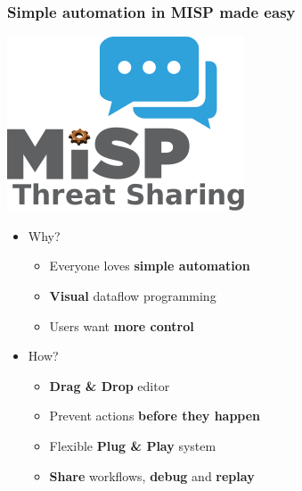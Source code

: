 \begin{frame}
    \frametitle{Simple automation in MISP made easy}
    \begin{center}
        \includegraphics[width=0.3\linewidth]{pictures/automation.png}
    \end{center}
    \begin{itemize}
        \item Why?
        \begin{itemize}
            \item Everyone loves \textbf{simple automation}
            \item \textbf{Visual} dataflow programming
            \item Users want \textbf{more control}
        \end{itemize}
        \item How?
        \begin{itemize}
            \item \textbf{Drag \& Drop} editor
            \item Prevent actions \textbf{before they happen}
            \item Flexible \textbf{Plug \& Play} system
            \item \textbf{Share} workflows, \textbf{debug} and \textbf{replay}
        \end{itemize}
    \end{itemize}
\end{frame}

